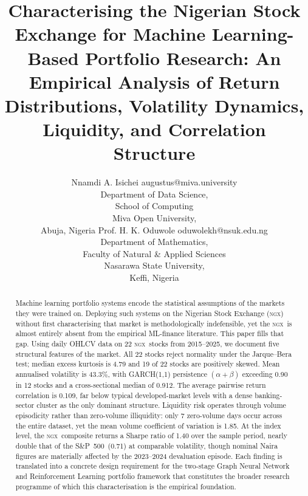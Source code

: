 \documentclass[twoside,11pt]{article}
\newcommand{\ngx}{\textsc{ngx}}
\newcommand{\spidx}{S\&P~500}
\begin{document}
	
	\title{Characterising the Nigerian Stock Exchange
		for Machine Learning-Based Portfolio Research:
		An Empirical Analysis of Return Distributions,
		Volatility Dynamics, Liquidity, and Correlation Structure}
	
	\author{\name Nnamdi A. Isichei \email augustus@miva.university \\
		\addr Department of Data Science,\\
		School of Computing\\
		Miva Open University, \\
		Abuja, Nigeria
		\AND
		\name Prof. H. K. Oduwole \email oduwolekh@nsuk.edu.ng \\
		\addr Department of Mathematics,\\
		Faculty of Natural \& Applied Sciences\\
		Nasarawa State University,\\
		Keffi, Nigeria}
	
	\editor{}
	\maketitle
	
	\begin{abstract}%
		Machine learning portfolio systems encode the statistical assumptions of the markets they were trained on. Deploying such systems on the Nigerian Stock Exchange (\ngx) without first characterising that
		market is methodologically indefensible, yet the \ngx\ is almost entirely absent from the empirical ML-finance literature. This paper fills that gap. Using daily OHLCV data on 22 \ngx\ stocks from
		2015--2025, we document five structural features of the market. All	22 stocks reject normality under the Jarque--Bera test; median excess kurtosis is 4.79 and 19 of 22 stocks are positively skewed. Mean annualised volatility is 43.3\%, with GARCH(1,1) persistence
		$(\alpha + \beta)$ exceeding 0.90 in 12 stocks and a cross-sectional	median of 0.912. The average pairwise return correlation is 0.109, far below typical developed-market levels with a dense
		banking-sector cluster as the only dominant structure. Liquidity risk operates through volume episodicity rather than zero-volume	illiquidity: only 7 zero-volume days occur across the entire dataset, yet the mean volume coefficient of variation is 1.85. At
		the index level, the \ngx\ composite returns a Sharpe ratio of 1.40 over the sample period, nearly double that of the \spidx\ (0.71) at comparable volatility, though nominal Naira figures are materially
		affected by the 2023--2024 devaluation episode. Each finding is translated into a concrete design requirement for the two-stage Graph Neural Network and Reinforcement Learning portfolio framework
		that constitutes the broader research programme of which this characterisation is the empirical foundation.
	\end{abstract}
	
\end{document}
